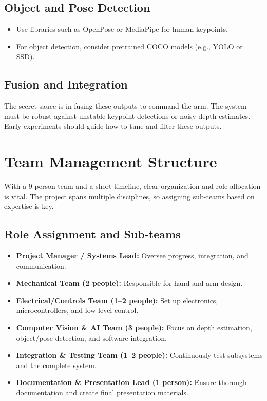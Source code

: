 \documentclass[document]{llncs}
\begin{document}
\subsection{Object and Pose Detection}
\begin{itemize}
  \item Use libraries such as OpenPose or MediaPipe for human keypoints.
  \item For object detection, consider pretrained COCO models (e.g., YOLO or SSD).
\end{itemize}

\subsection{Fusion and Integration}
The secret sauce is in fusing these outputs to command the arm. The system must be robust against unstable keypoint detections or noisy depth estimates. Early experiments should guide how to tune and filter these outputs.

\section{Team Management Structure}
With a 9-person team and a short timeline, clear organization and role allocation is vital. The project spans multiple disciplines, so assigning sub-teams based on expertise is key.

\subsection{Role Assignment and Sub-teams}
\begin{itemize}
  \item \textbf{Project Manager / Systems Lead:} Oversee progress, integration, and communication.
  \item \textbf{Mechanical Team (2 people):} Responsible for hand and arm design.
  \item \textbf{Electrical/Controls Team (1--2 people):} Set up electronics, microcontrollers, and low-level control.
  \item \textbf{Computer Vision \& AI Team (3 people):} Focus on depth estimation, object/pose detection, and software integration.
  \item \textbf{Integration \& Testing Team (1--2 people):} Continuously test subsystems and the complete system.
  \item \textbf{Documentation \& Presentation Lead (1 person):} Ensure thorough documentation and create final presentation materials.
\end{itemize}
\end{document}
